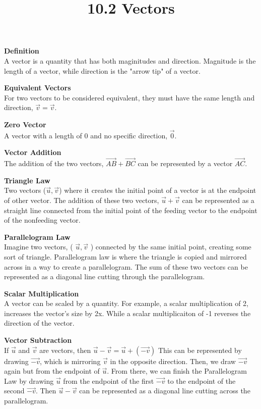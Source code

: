 \documentclass{article}
\title{10.2 Vectors}
\begin{document}
  \maketitle
  \textbf{Definition}\\
  A vector is a quantity that has both maginitudes and direction. Magnitude is the length of a vector, while direction is the "arrow tip" of a vector.

  \textbf{Equivalent Vectors}\\
  For two vectors to be considered equivalent, they must have the same length and direction, $ \vec{ v } = \vec{ v } $.

  \textbf{Zero Vector} \\
  A vector with a length of $0$ and no specific direction, $ \vec{ 0 }  $.  

  \textbf{Vector Addition}\\
  The addition of the two vectors, $ \vec{ AB } + \vec{BC} $ can be represented by a vector $ \vec{ AC } $.

  \textbf{Triangle Law}\\
  Two vectors ($ \vec{ u }, \vec{ v } $) where it creates the initial point of a vector is at the endpoint of other vector. The addition of these two vectors, $ \vec{ u } + \vec{ v } $ can be represented as a straight line connected from the initial point of the feeding vector to the endpoint of the nonfeeding vector.

  \textbf{Parallelogram Law}\\
  Imagine two vectors, ( $ \vec{ u }, \vec{ v } $ ) connected by the same initial point, creating some sort of triangle. Parallelogram law is where the triangle is copied and mirrored across in a way to create a parallelogram. The sum of these two vectors can be represented as a diagonal line cutting through the parallelogram.

  \textbf{Scalar Multiplication}\\
  A vector can be scaled by a quantity. For example, a scalar multiplication of 2, increases the vector's size by 2x. While a scalar multiplicaiton of -1 reverses the direction of the vector.

  \textbf{Vector Subtraction}\\
  If $\vec{u}$ and $ \vec{ v } $ are vectors, then $ \vec{ u } - \vec{ v } = \vec{ u } + ( \vec{ -v }  )$ This can be represented by drawing $ \vec{ -v } $, which is mirroring $ \vec{ v } $ in the opposite direction. Then, we draw $ \vec{ -v } $ again but from the endpoint of $ \vec{ u } $. From there, we can finish the Parallelogram Law by drawing $ \vec{ u } $ from the endpoint of the first $ \vec{ -v } $ to the endpoint of the second $ \vec{ -v } $. Then $ \vec{ u } - \vec{ v } $ can be represented as a diagonal line cutting across the parallelogram.
\end{document}
